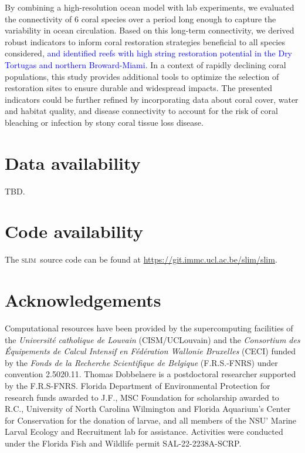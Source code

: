 \documentclass[preprint,12pt,authoryear]{elsarticle}
\newcommand{\modif}[1]{\textcolor{blue}{#1}}
\newcommand{\slim}{\textsc{slim}\ }
\begin{document}
	
	By combining a high-resolution ocean model with lab experiments, we evaluated the connectivity of 6 coral species over a period long enough to capture the variability in ocean circulation. Based on this long-term connectivity, we derived robust indicators to inform coral restoration strategies beneficial to all species considered, \modif{and identified reefs with high string restoration potential in the Dry Tortugas and northern Broward-Miami}. In a context of rapidly declining coral populations, this study provides additional tools to optimize the selection of restoration sites to ensure durable and widespread impacts. The presented indicators could be further refined by incorporating data about coral cover, water and habitat quality, and disease connectivity to account for the risk of coral bleaching or infection by stony coral tissue loss disease.
	
	
	\section*{Data availability}
	
	TBD.
	
	\section*{Code availability}
	
	The \slim source code can be found at \href{https://git.immc.ucl.ac.be/slim/slim}{https://git.immc.ucl.ac.be/slim/slim}.
	
	\section*{Acknowledgements}
	
	Computational resources have been provided by the supercomputing facilities of the \textit{Universit\'e catholique de Louvain} (CISM/UCLouvain) and the \textit{Consortium des \'Equipements de Calcul Intensif en F\'ed\'eration Wallonie Bruxelles} (CECI) funded by the \textit{Fonds de la Recherche Scientifique de Belgique} (F.R.S.-FNRS) under convention 2.5020.11. Thomas Dobbelaere is a postdoctoral researcher supported by the F.R.S-FNRS. Florida Department of Environmental Protection for research funds awarded to J.F., MSC Foundation for scholarship awarded to R.C., University of North Carolina Wilmington and Florida Aquarium’s Center for Conservation for the donation of larvae, and all members of the NSU’ Marine Larval Ecology and Recruitment lab for assistance. Activities were conducted under the Florida Fish and Wildlife permit SAL-22-2238A-SCRP.
	
\end{document}
